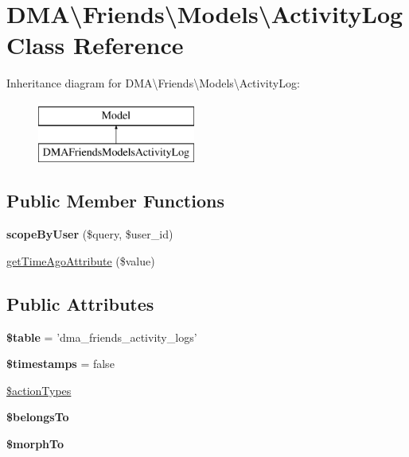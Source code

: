 \hypertarget{classDMA_1_1Friends_1_1Models_1_1ActivityLog}{\section{D\+M\+A\textbackslash{}Friends\textbackslash{}Models\textbackslash{}Activity\+Log Class Reference}
\label{classDMA_1_1Friends_1_1Models_1_1ActivityLog}
}
Inheritance diagram for D\+M\+A\textbackslash{}Friends\textbackslash{}Models\textbackslash{}Activity\+Log\+:\begin{figure}[H]
\begin{center}
\leavevmode
\includegraphics[height=2.000000cm]{d8/ddf/classDMA_1_1Friends_1_1Models_1_1ActivityLog}
\end{center}
\end{figure}
\subsection*{Public Member Functions}
\begin{DoxyCompactItemize}
\item 
\hypertarget{classDMA_1_1Friends_1_1Models_1_1ActivityLog_afee4eb22dd72600db4819f1924323610}{{\bfseries scope\+By\+User} (\$query, \$user\+\_\+id)}\label{classDMA_1_1Friends_1_1Models_1_1ActivityLog_afee4eb22dd72600db4819f1924323610}

\item 
\hyperlink{classDMA_1_1Friends_1_1Models_1_1ActivityLog_aa9eef6535dca7db82fa2be959a76efb1}{get\+Time\+Ago\+Attribute} (\$value)
\end{DoxyCompactItemize}
\subsection*{Public Attributes}
\begin{DoxyCompactItemize}
\item 
\hypertarget{classDMA_1_1Friends_1_1Models_1_1ActivityLog_a231d21bb93f9c0079c3f5cf51369d0c1}{{\bfseries \$table} = 'dma\+\_\+friends\+\_\+activity\+\_\+logs'}\label{classDMA_1_1Friends_1_1Models_1_1ActivityLog_a231d21bb93f9c0079c3f5cf51369d0c1}

\item 
\hypertarget{classDMA_1_1Friends_1_1Models_1_1ActivityLog_a11055e835c6bf48f58e019267dd469a2}{{\bfseries \$timestamps} = false}\label{classDMA_1_1Friends_1_1Models_1_1ActivityLog_a11055e835c6bf48f58e019267dd469a2}

\item 
\hyperlink{classDMA_1_1Friends_1_1Models_1_1ActivityLog_aa60b5fe0e1e7c254827bfa35c69aef9d}{\$action\+Types}
\item 
{\bfseries \$belongs\+To}
\item 
{\bfseries \$morph\+To}
\end{DoxyCompactItemize}

